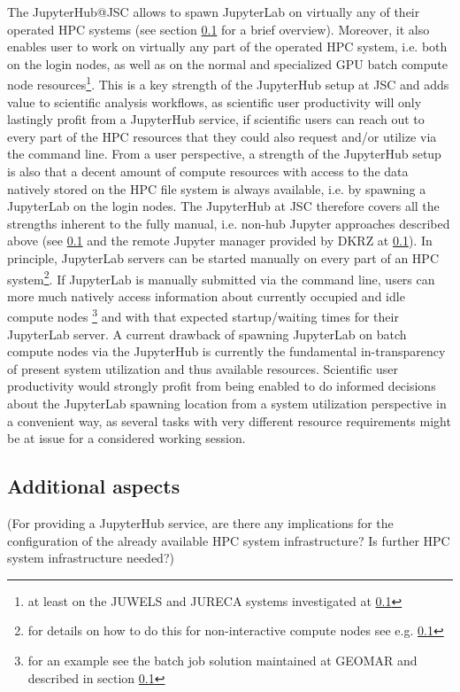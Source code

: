 The JupyterHub@JSC allows to spawn JupyterLab on virtually any of their operated HPC systems (see section \ref{} for a brief overview).
Moreover, it also enables user to work on virtually any part of the operated HPC system, i.e. both on the login nodes, as well as on the normal and specialized GPU batch compute node resources\footnote{at least on the JUWELS and JURECA systems investigated at \ref{}}.
This is a key strength of the JupyterHub setup at JSC and adds value to scientific analysis workflows, as scientific user productivity will only lastingly profit from a JupyterHub service, if scientific users can reach out to every part of the HPC resources that they could also request and/or utilize via the command line.
From a user perspective, a strength of the JupyterHub setup is also that a decent amount of compute resources with access to the data natively stored on the HPC file system is always available, i.e. by spawning a JupyterLab on the login nodes.
The JupyterHub at JSC therefore covers all the strengths inherent to the fully manual, i.e. non-hub Jupyter approaches described above (see \ref{} and the remote Jupyter manager provided by DKRZ at \ref{}).
In principle, JupyterLab servers can be started manually on every part of an HPC system\footnote{for details on how to do this for non-interactive compute nodes see e.g. \ref{}}.
If JupyterLab is manually submitted via the command line, users can more much natively access information about currently occupied and idle compute nodes \footnote{for an example see the batch job solution maintained at GEOMAR and described in section \ref{}} and with that expected startup/waiting times for their JupyterLab server.
A current drawback of spawning JupyterLab on batch compute nodes via the JupyterHub is currently the fundamental in-transparency of present system utilization and thus available resources.
Scientific user productivity would strongly profit from being enabled to do informed decisions about the JupyterLab spawning location from a system utilization perspective in a convenient way, as several tasks with very different resource requirements might be at issue for a considered working session.

\subsection{Additional aspects}

(For providing a JupyterHub service, are there any implications for the configuration of the already available HPC system infrastructure? Is further HPC system infrastructure needed?)

